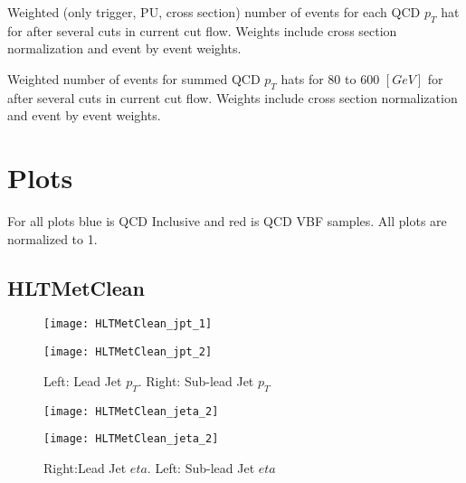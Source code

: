 \documentclass[a4paper,10pt]{article}
\begin{document}
\begin{table}[!h]
\centering
\resizebox{\linewidth}{!}{}
\caption{Weighted (only trigger, PU, cross section) number of events for each QCD $p_T$ hat for after several cuts in current cut flow. Weights include cross section normalization and event by event weights.}
\end{table}

\begin{table}[!h]
\centering

\caption{Weighted number of events for summed QCD $p_T$ hats for 80 to 600 $[GeV]$ for after several cuts in current cut flow. Weights include cross section normalization and event by event weights.}
\end{table}

\section{Plots}

For all plots blue is QCD Inclusive and red is QCD VBF samples. All plots are normalized to 1.

\clearpage
\subsection{HLTMetClean}

\begin{figure}[!h]
\centering
\begin{minipage}[!h]{0.4\linewidth}
\centering
\texttt{[image: HLTMetClean\_jpt\_1]}
\end{minipage}%
\begin{minipage}[!h]{0.4\linewidth}
  \texttt{[image: HLTMetClean\_jpt\_2]}
\end{minipage}
\caption{Left: Lead Jet $p_T$. Right: Sub-lead Jet $p_T$}
\end{figure}

\begin{figure}[!h]
\centering
\begin{minipage}[!h]{0.4\linewidth}
\centering
\texttt{[image: HLTMetClean\_jeta\_2]}
\end{minipage}%
\begin{minipage}[!h]{0.4\linewidth}
\centering
\texttt{[image: HLTMetClean\_jeta\_2]}
\end{minipage}
\caption{Right:Lead Jet $eta$. Left: Sub-lead Jet $eta$}
\end{figure}
\end{document}
